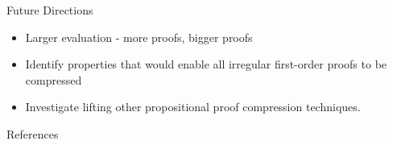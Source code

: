 \documentclass[final]{beamer} %
\begin{document}
\begin{frame}{}
\begin{columns}
\begin{column}{0.48\textwidth}
          \begin{block}{Future Directions}
    \begin{itemize}
    \item Larger evaluation - more proofs, bigger proofs
    \item Identify properties that would enable all irregular first-order proofs to be compressed
    \item Investigate lifting other propositional proof compression techniques.
    \end{itemize}
    	\end{block}
    

     \begin{block}{References}


    \end{block}    

        \vfill
  \end{column}
\end{columns}


    
  \end{frame}
\end{document}
